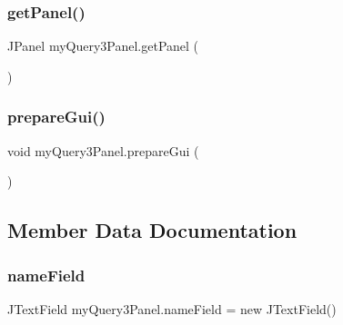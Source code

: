 \hypertarget{classmy_query3_panel_a7e32c709687bc0e276dbfb4abc101c83}{}\label{classmy_query3_panel_a7e32c709687bc0e276dbfb4abc101c83} 
\subsubsection{\texorpdfstring{get\+Panel()}{getPanel()}}
{\footnotesize\ttfamily J\+Panel my\+Query3\+Panel.\+get\+Panel (\begin{DoxyParamCaption}{ }\end{DoxyParamCaption})}

\hypertarget{classmy_query3_panel_a0ba85999b328528fb1255d54f9e35adf}{}\label{classmy_query3_panel_a0ba85999b328528fb1255d54f9e35adf} 
\subsubsection{\texorpdfstring{prepare\+Gui()}{prepareGui()}}
{\footnotesize\ttfamily void my\+Query3\+Panel.\+prepare\+Gui (\begin{DoxyParamCaption}{ }\end{DoxyParamCaption})}



\subsection{Member Data Documentation}
\hypertarget{classmy_query3_panel_a35151bea612812b2db64eefe6afb8a6a}{}\label{classmy_query3_panel_a35151bea612812b2db64eefe6afb8a6a} 
\subsubsection{\texorpdfstring{name\+Field}{nameField}}
{\footnotesize\ttfamily J\+Text\+Field my\+Query3\+Panel.\+name\+Field = new J\+Text\+Field()\hspace{0.3cm}{\ttfamily [private]}}

\hypertarget{classmy_query3_panel_a207acd41522a838e3d706c627e17a84d}{}\label{classmy_query3_panel_a207acd41522a838e3d706c627e17a84d} 
